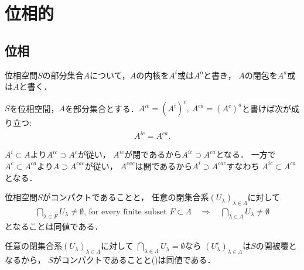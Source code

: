\section{位相的}
\subsection{位相}
	位相空間$S$の部分集合$A$について，$A$の内核を$A^i$或は$A^{\mathrm{o}}$と書き，
	$A$の閉包を$A^a$或は$\overline{A}$と書く．
	\begin{screen}
		\begin{thm}[閉包・内核]\label{thm:topology_note_closure_interior}
			$S$を位相空間，$A$を部分集合とする．$A^{ic} = (A^i)^c,\ A^{ca} = (A^c)^a$と書けば次が成り立つ:
			\begin{align}
				A^{ic} = A^{ca}.
			\end{align}
		\end{thm}
	\end{screen}
	
	\begin{prf}
		$A^i \subset A$より$A^{ic} \supset A^c$が従い，
		$A^{ic}$が閉であるから$A^{ic} \supset A^{ca}$となる．
		一方で$A^c \subset A^{ca}$より$A \supset A^{cac}$が従い，
		$A^{cac}$は開であるから$A^i \supset A^{cac}$すなわち
		$A^{ic} \subset A^{ca}$となる．
		\QED
	\end{prf}
	
	\begin{screen}
		\begin{thm}[有限交叉性]\label{thm:finite_intersection_property}
			位相空間$S$がコンパクトであることと，
			任意の閉集合系$(U_\lambda)_{\lambda \in \Lambda}$に対して
			\begin{align} 
				\bigcap_{\lambda \in F} U_\lambda \neq \emptyset
				\mbox{, for every finite subset $F \subset \Lambda$}
				\quad \Longrightarrow \quad \bigcap_{\lambda \in \Lambda} U_\lambda \neq \emptyset
				\label{eq:finite_intersection_property}
			\end{align}
			となることは同値である．
		\end{thm}
	\end{screen}
	
	\begin{prf}
		任意の閉集合系$(U_\lambda)_{\lambda \in \Lambda}$に対して
		$\bigcap_{\lambda \in \Lambda} U_\lambda = \emptyset$なら
		$(U_\lambda^c)_{\lambda \in \Lambda}$は$S$の開被覆となるから，
		$S$がコンパクトであることと()は同値である．
		\QED
	\end{prf}
	
